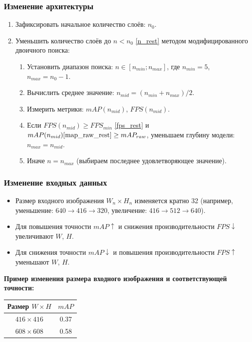 \documentclass[a4paper,12pt]{article}
\begin{document}
\subsubsection*{Изменение архитектуры}
\begin{enumerate}
    \item Зафиксировать начальное количество слоёв: $n_0$.
    \item Уменьшить количество слоёв до $n < n_0$ \ref{n_rest} методом модифицированного двоичного поиска:
    \begin{enumerate}
        \item Установить диапазон поиска: $n \in [n_{min}; n_{max}]$, где $n_{min} = 5$, $n_{max} = n_0 - 1$.
        \item Вычислить среднее значение: $n_{mid} = (n_{min} + n_{max})/2$.
        \item Измерить метрики: $mAP(n_{mid})$, $FPS(n_{mid})$.
        \item Если $FPS(n_{mid}) \ge FPS_{min}$ \ref{fps_rest} и $mAP(n_{mid}) \ref{map_raw_rest} \ge mAP_{raw}$, уменьшаем глубину модели: $n_{max} = n_{mid}$.
        \item Иначе $n = n_{max}$ (выбираем последнее удовлетворяющее значение).
    \end{enumerate}
\end{enumerate}

\subsubsection*{Изменение входных данных}
\begin{itemize}
    \item Размер входного изображения $W_n \times H_n$ изменяется кратно 32 (например, уменьшение: $640 \rightarrow 416 \rightarrow 320$, увеличение: $416 \rightarrow 512 \rightarrow 640$).
    \item Для повышения точности $mAP\uparrow$ и снижения производительности $FPS\downarrow$ увеличивают $W$, $H$.
    \item Для снижения точности $mAP\downarrow$ и повышения производительности $FPS\uparrow$ уменьшают $W$, $H$.
\end{itemize}

\textbf{Пример изменения размера входного изображения и соответствующей точности:}

\begin{center}
\begin{tabular}{c c}
\hline
Размер $W \times H$ & $mAP$ \\
\hline
$416 \times 416$ & 0.37 \\
$608 \times 608$ &  0.58 \\
\hline
\end{tabular}
\end{center}
\end{document}

